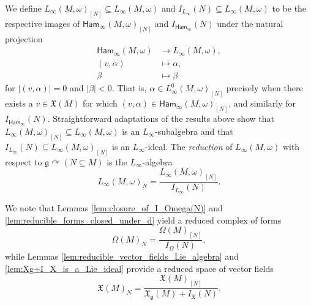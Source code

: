 \documentclass[10pt,a4paper]{amsart}
\numberwithin{equation}{section}
\newcommand{\g}{\mathfrak{g}}
\newcommand{\Ham}{\mathsf{Ham}}
\newcommand{\X}{\mathfrak{X}}
\renewcommand{\subset}{\subseteq}
\begin{document}
\begin{Definition}\label{def:associatedLinftyReductions}
	We define $L_\infty(M,\omega)_{[N]}\subset L_\infty(M,\omega)$ and $I_{L_\infty}(N)\subset L_\infty(M,\omega)$ to be the respective images of $\Ham_\infty(M,\omega)_{[N]}$ and $I_{\Ham_\infty}(N)$ under the natural projection
	\begin{align*}
		\Ham_\infty(M,\omega)	&\to		L_\infty(M,\omega),	\\
		(v,\alpha)		&\mapsto	\alpha,		\\
		\beta		&\mapsto	\beta
	\end{align*}
	for $|(v,\alpha)|=0$ and $|\beta|<0$. That is, $\alpha\in L_\infty^0(M,\omega)_{[N]}$ precisely when there exists a $v\in\X(M)$ for which $(v,\alpha)\in\Ham_\infty(M,\omega)_{[N]}$, and similarly for $I_{\Ham_\infty}(N)$. Straightforward adaptations of the results above show that $L_\infty(M,\omega)_{[N]}\subset L_\infty(M,\omega)$ is an $L_\infty$-subalgebra and that $I_{L_\infty}(N)\subset L_\infty(M,\omega)_{[N]}$ is an $L_\infty$-ideal. The \emph{reduction} of $L_\infty(M,\omega)$ with respect to $\g\curvearrowright (N\subset M)$ is the $L_\infty$-algebra
	\[
		L_\infty(M,\omega)_N = \frac{L_\infty(M,\omega)_{[N]}}{I_{L_\infty}(N)}.
	\]
\end{Definition}

\begin{Remark}\label{rem:reduced_spaces_of_vfs_and_forms}
	We note that Lemmas \ref{lem:closure_of_I_Omega(N)} and \ref{lem:reducible_forms_closed_under_d} yield a reduced complex of forms
	\[
		\Omega(M)_N = \frac{\Omega(M)_{[N]}}{I_\Omega(N)},
	\]
	while Lemmas \ref{lem:reducible_vector_fields_Lie_algebra} and \ref{lem:Xg+I_X_is_a_Lie_ideal} provide a reduced space of vector fields
	\[
		\X(M)_N = \frac{\X(M)_{[N]}}{\X_\g(M)+I_\X(N)}.
	\]
\end{Remark}
\end{document}
